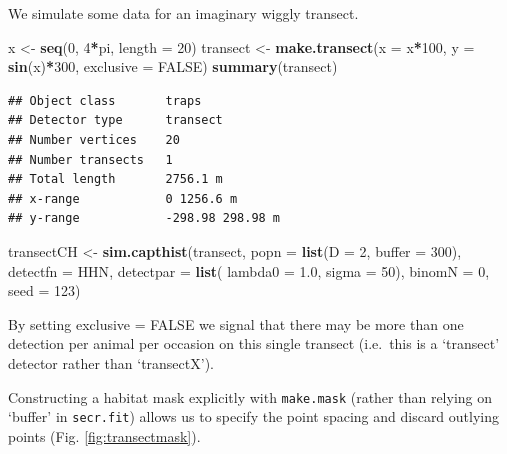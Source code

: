 \documentclass[
]{book}
\newenvironment{Shaded}{\begin{snugshade}}{\end{snugshade}}
\newcommand{\AttributeTok}[1]{\textcolor[rgb]{0.13,0.29,0.53}{#1}}
\newcommand{\ConstantTok}[1]{\textcolor[rgb]{0.56,0.35,0.01}{#1}}
\newcommand{\DecValTok}[1]{\textcolor[rgb]{0.00,0.00,0.81}{#1}}
\newcommand{\FloatTok}[1]{\textcolor[rgb]{0.00,0.00,0.81}{#1}}
\newcommand{\FunctionTok}[1]{\textcolor[rgb]{0.13,0.29,0.53}{\textbf{#1}}}
\newcommand{\NormalTok}[1]{#1}
\newcommand{\OtherTok}[1]{\textcolor[rgb]{0.56,0.35,0.01}{#1}}
\newcommand{\SpecialCharTok}[1]{\textcolor[rgb]{0.81,0.36,0.00}{\textbf{#1}}}
\newcommand{\StringTok}[1]{\textcolor[rgb]{0.31,0.60,0.02}{#1}}
\begin{document}
We simulate some data for an imaginary wiggly transect.

\begin{Shaded}
\begin{Highlighting}[]
\NormalTok{x }\OtherTok{\textless{}{-}} \FunctionTok{seq}\NormalTok{(}\DecValTok{0}\NormalTok{, }\DecValTok{4}\SpecialCharTok{*}\NormalTok{pi, }\AttributeTok{length =} \DecValTok{20}\NormalTok{)}
\NormalTok{transect }\OtherTok{\textless{}{-}} \FunctionTok{make.transect}\NormalTok{(}\AttributeTok{x =}\NormalTok{ x}\SpecialCharTok{*}\DecValTok{100}\NormalTok{, }\AttributeTok{y =} \FunctionTok{sin}\NormalTok{(x)}\SpecialCharTok{*}\DecValTok{300}\NormalTok{, }
    \AttributeTok{exclusive =} \ConstantTok{FALSE}\NormalTok{)}
\FunctionTok{summary}\NormalTok{(transect)}
\end{Highlighting}
\end{Shaded}

\begin{verbatim}
## Object class       traps 
## Detector type      transect 
## Number vertices    20 
## Number transects   1 
## Total length       2756.1 m 
## x-range            0 1256.6 m 
## y-range            -298.98 298.98 m
\end{verbatim}

\begin{Shaded}
\begin{Highlighting}[]
\NormalTok{transectCH }\OtherTok{\textless{}{-}} \FunctionTok{sim.capthist}\NormalTok{(transect, }\AttributeTok{popn =} \FunctionTok{list}\NormalTok{(}\AttributeTok{D =} \DecValTok{2}\NormalTok{, }
    \AttributeTok{buffer =} \DecValTok{300}\NormalTok{), }\AttributeTok{detectfn =} \StringTok{\textquotesingle{}HHN\textquotesingle{}}\NormalTok{, }\AttributeTok{detectpar =} \FunctionTok{list}\NormalTok{(}
    \AttributeTok{lambda0 =} \FloatTok{1.0}\NormalTok{, }\AttributeTok{sigma =} \DecValTok{50}\NormalTok{), }\AttributeTok{binomN =} \DecValTok{0}\NormalTok{, }\AttributeTok{seed =} \DecValTok{123}\NormalTok{)}
\end{Highlighting}
\end{Shaded}

By setting exclusive = FALSE we signal that there may be more than one detection per animal per occasion on this single transect (i.e.~this is a `transect' detector rather than `transectX').

Constructing a habitat mask explicitly with \texttt{make.mask} (rather than relying on `buffer' in \texttt{secr.fit}) allows us to
specify the point spacing and discard outlying points (Fig. \ref{fig:transectmask}).
\end{document}
